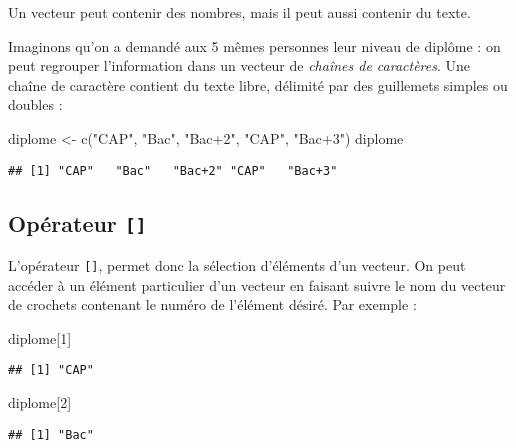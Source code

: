 \documentclass[
]{article}
\newenvironment{Shaded}{\begin{snugshade}}{\end{snugshade}}
\newcommand{\DecValTok}[1]{\textcolor[rgb]{0.00,0.00,0.81}{#1}}
\newcommand{\FunctionTok}[1]{\textcolor[rgb]{0.00,0.00,0.00}{#1}}
\newcommand{\NormalTok}[1]{#1}
\newcommand{\OtherTok}[1]{\textcolor[rgb]{0.56,0.35,0.01}{#1}}
\newcommand{\StringTok}[1]{\textcolor[rgb]{0.31,0.60,0.02}{#1}}
\begin{document}
Un vecteur peut contenir des nombres, mais il peut aussi contenir du
texte.

Imaginons qu'on a demandé aux 5 mêmes personnes leur niveau de diplôme :
on peut regrouper l'information dans un vecteur de \emph{chaînes de
caractères}. Une chaîne de caractère contient du texte libre, délimité
par des guillemets simples ou doubles :

\begin{Shaded}
\begin{Highlighting}[]
\NormalTok{diplome }\OtherTok{\textless{}{-}} \FunctionTok{c}\NormalTok{(}\StringTok{"CAP"}\NormalTok{, }\StringTok{"Bac"}\NormalTok{, }\StringTok{"Bac+2"}\NormalTok{, }\StringTok{"CAP"}\NormalTok{, }\StringTok{"Bac+3"}\NormalTok{)}
\NormalTok{diplome}
\end{Highlighting}
\end{Shaded}

\begin{verbatim}
## [1] "CAP"   "Bac"   "Bac+2" "CAP"   "Bac+3"
\end{verbatim}

\hypertarget{opuxe9rateur}{%
\subsection{\texorpdfstring{Opérateur
\texttt{{[}{]}}}{Opérateur {[}{]}}}\label{opuxe9rateur}}

L'opérateur \texttt{{[}{]}}, permet donc la sélection d'éléments d'un
vecteur. On peut accéder à un élément particulier d'un vecteur en
faisant suivre le nom du vecteur de crochets contenant le numéro de
l'élément désiré. Par exemple :

\begin{Shaded}
\begin{Highlighting}[]
\NormalTok{diplome[}\DecValTok{1}\NormalTok{]}
\end{Highlighting}
\end{Shaded}

\begin{verbatim}
## [1] "CAP"
\end{verbatim}

\begin{Shaded}
\begin{Highlighting}[]
\NormalTok{diplome[}\DecValTok{2}\NormalTok{]}
\end{Highlighting}
\end{Shaded}

\begin{verbatim}
## [1] "Bac"
\end{verbatim}
\end{document}
